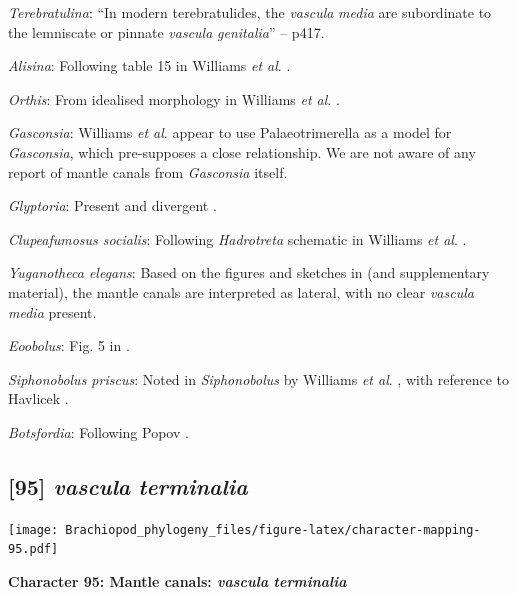 \documentclass[openany]{book}
\theoremstyle{definition}
\theoremstyle{definition}
\theoremstyle{definition}
\theoremstyle{remark}
\begin{document}
\emph{Terebratulina}: ``In modern terebratulides, the \emph{vascula}
\emph{media} are subordinate to the lemniscate or pinnate \emph{vascula}
\emph{genitalia}'' -- \citet{Williams1997BrachiopodaRevised} p417.

\emph{Alisina}: Following table 15 in Williams \emph{et al}.
\citeyearpar{Williams2000BrachiopodaLinguliformea}.

\emph{Orthis}: From idealised morphology in Williams \emph{et al}.
\citeyearpar{Williams2000BrachiopodaLinguliformea}.

\emph{Gasconsia}: Williams \emph{et al}. \citeyearpar[table
15]{Williams2000BrachiopodaLinguliformea} appear to use Palaeotrimerella
\citep[as drawn in][]{Williams1997BrachiopodaRevised} as a model for
\emph{Gasconsia}, which pre-supposes a close relationship. We are not
aware of any report of mantle canals from \emph{Gasconsia} itself.

\emph{Glyptoria}: Present and divergent
\citep{Williams2000BrachiopodaLinguliformea}.

\emph{Clupeafumosus socialis}: Following \emph{Hadrotreta} schematic in
Williams \emph{et al}.
\citeyearpar{Williams2000BrachiopodaLinguliformea}.

\emph{Yuganotheca elegans}: Based on the figures and sketches in
\citet{Zhang2014Anearly} (and supplementary material), the mantle canals
are interpreted as lateral, with no clear \emph{vascula} \emph{media}
present.

\emph{Eoobolus}: Fig. 5 in \citet{Balthasar2009Thebrachiopod}.

\emph{Siphonobolus priscus}: Noted in \emph{Siphonobolus} by Williams
\emph{et al}. \citeyearpar{Williams2000BrachiopodaLinguliformea}, with
reference to Havlicek \citeyearpar{Havlicek1982LingulaceaPaterinacea}.

\emph{Botsfordia}: Following Popov \citeyearpar[fig.
2]{Popov1992TheCambrian}.

\hypertarget{vascula-terminalia}{%
\subsection*{\texorpdfstring{{[}95{]} \emph{vascula}
\emph{terminalia}}{{[}95{]} vascula terminalia}}\label{vascula-terminalia}}

\texttt{[image: Brachiopod\_phylogeny\_files/figure-latex/character-mapping-95.pdf]}

\textbf{Character 95: Mantle canals: \emph{vascula} \emph{terminalia}}
\end{document}
